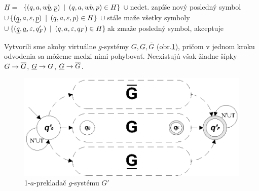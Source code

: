 \begin{dokaz}
\begin{enumerate}
\begin{enumerate}
\begin{tabbing}
        \>\>$\underline{H}$\>$=$\>
        $\{(q,a,w\underline{b},\underline{p})\enspace |\enspace (q,a,wb,p)\in
        H\}\enspace\cup$\>nedet. zapíše nový posledný symbol\\
        \>\>\>$\cup$\>$\{(\underline{q},a,\varepsilon,\underline{p})\enspace |\enspace
        (q,a,\varepsilon,p)\in H\}\enspace\cup$\>stále maže všetky symboly\\
        \>\>\>$\cup$\>$\{(\underline{q},\underline{a},\varepsilon,q'_F)\enspace |\enspace
        (q,a,\varepsilon,q_F)\in H\}$\>ak zmaže posledný symbol, akceptuje
      \end{tabbing}
      Vytvorili sme akoby virtuálne $g$-systémy
      $G,\underline{G},\overline{G}$ (obr.\ref{gs_obr_gsp1}), pričom v
      jednom kroku odvodenia sa môžeme medzi nimi pohybovať. Neexistujú
      však žiadne šípky $G\rightarrow\overline{G}$, $\underline{G}\rightarrow
      G$, $\underline{G}\rightarrow\overline{G}$.

      \begin{figure}[!ht]
        \centering
        \includegraphics{img/gsystems/g_s_p_1}
        \caption{1-$a$-prekladač $g$-systému $G'$} \label{gs_obr_gsp1}
      \end{figure}


\end{enumerate}
\end{enumerate}
\end{dokaz}
